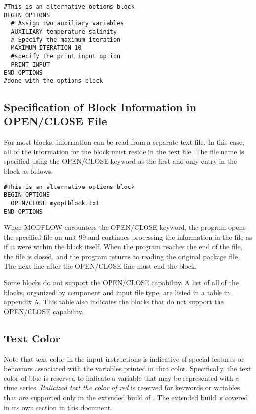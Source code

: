 \begin{lstlisting}[style=inputfile]
#This is an alternative options block
BEGIN OPTIONS
  # Assign two auxiliary variables
  AUXILIARY temperature salinity
  # Specify the maximum iteration
  MAXIMUM_ITERATION 10
  #specify the print input option
  PRINT_INPUT
END OPTIONS
#done with the options block
\end{lstlisting}

\subsection{Specification of Block Information in OPEN/CLOSE File} 
For most blocks, information can be read from a separate text file.  In this case, all of the information for the block must reside in the text file.  The file name is specified using the OPEN/CLOSE keyword as the first and only entry in the block as follows:

\begin{lstlisting}[style=inputfile]
#This is an alternative options block
BEGIN OPTIONS
  OPEN/CLOSE myoptblock.txt
END OPTIONS
\end{lstlisting}

\noindent When MODFLOW encounters the OPEN/CLOSE keyword, the program opens the specified file on unit 99 and continues processing the information in the file as if it were within the block itself.  When the program reaches the end of the file, the file is closed, and the program returns to reading the original package file.  The next line after the OPEN/CLOSE line must end the block.

Some blocks do not support the OPEN/CLOSE capability.  A list of all of the blocks, organized by component and input file type, are listed in a table in appendix A.  This table also indicates the blocks that do not support the OPEN/CLOSE capability.

\subsection{Text Color}

Note that text color in the input instructions is indicative of special features or behaviors associated with the variables printed in that color.  Specifically, the {\color{blue} text color of blue} is reserved to indicate a variable that may be represented with a time series.  {\itshape\color{red} Italicized text the  color of red} is reserved for keywords or variables that are supported only in the extended build of \mf.  The extended build is covered in its own section in this document.


